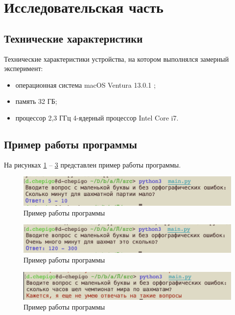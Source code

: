 \section{Исследовательская часть}

\subsection{Технические характеристики}

Технические характеристики устройства, на котором выполнялся замерный эксперимент:
\begin{itemize}[label*=---]
	\item операционная система macOS  Ventura 13.0.1 \cite{ventura};
	\item память 32 ГБ;
	\item процессор 2,3 ГГц 4-ядерный процессор Intel Core i7.
\end{itemize}

\subsection{Пример работы программы}

На рисунках \ref{img:example} -- \ref{img:example3} представлен пример работы программы. 

\begin{figure}[!h]
	\centering
	\includegraphics[width=150mm]{images/prim1}
	\caption{Пример работы программы}
	\label{img:example}
\end{figure}

\begin{figure}[!h]
	\centering
	\includegraphics[width=150mm]{images/prim2}
	\caption{Пример работы программы}
	\label{img:example2}
\end{figure}

\begin{figure}[!h]
	\centering
	\includegraphics[width=150mm]{images/prim3}
	\caption{Пример работы программы}
	\label{img:example3}
\end{figure}
